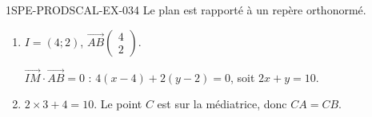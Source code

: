 \begin{corrige}{1SPE-PRODSCAL-EX-034}
Le plan est rapporté à un repère orthonormé.

\begin{enumerate}
\item $I = (4; 2)$, $\overrightarrow{AB}\begin{pmatrix} 4 \\ 2 \end{pmatrix}$.

$\overrightarrow{IM} \cdot \overrightarrow{AB} = 0$ : $4(x - 4) + 2(y - 2) = 0$, soit $2x + y = 10$.

\item $2 \times 3 + 4 = 10$. \checkmark Le point $C$ est sur la médiatrice, donc $CA = CB$.
\end{enumerate}
\end{corrige}
